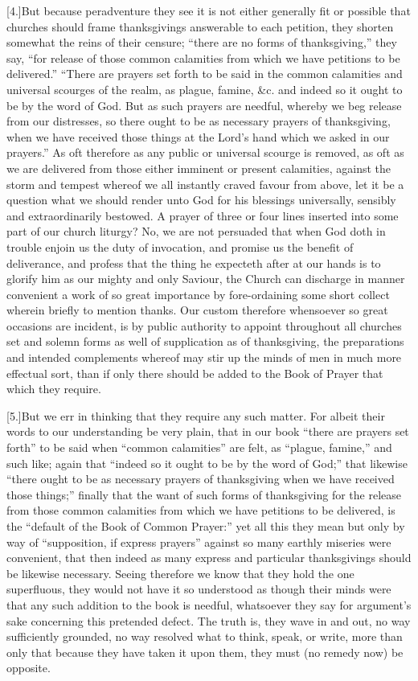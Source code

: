 [4.]But because peradventure they see it is not either generally fit or possible that churches should frame thanksgivings answerable to each petition, they shorten somewhat the reins of their censure; “there are no forms of thanksgiving,” they say, “for release of those common calamities from which we have petitions to be delivered.” “There are prayers set forth to be said in the common calamities and universal scourges of the realm, as plague, famine, \&c. and indeed so it ought to be by the word of God. But as such prayers are needful, whereby we beg release from our distresses, so there ought to be as necessary prayers of thanksgiving, when we have received those things at the Lord’s hand which we asked in our prayers.” As oft therefore as any public or universal scourge is removed, as oft as we are delivered from those either imminent or present calamities, against the storm and tempest whereof we all instantly craved favour from above, let it be a question what we should render unto God for his blessings universally, sensibly and extraordinarily bestowed. A prayer of three or four lines inserted into some part of our church liturgy? No, we are not persuaded that when God doth in trouble enjoin us the duty of invocation, and promise us the benefit of deliverance, and profess that the thing he expecteth  after at our hands is to glorify him as our mighty and only Saviour,
 the Church can discharge in manner convenient a work of so great importance by fore-ordaining some short collect wherein briefly to mention thanks. Our custom therefore whensoever so great occasions are incident, is by public authority to appoint throughout all churches set and solemn forms as well of supplication as of thanksgiving, the preparations and intended complements whereof may stir up the minds of men in much more effectual sort, than if only there should be added to the Book of Prayer that which they require.

[5.]But we err in thinking that they require any such matter. For albeit their words to our understanding be very plain, that in our book “there are prayers set forth” to be said when “common calamities” are felt, as “plague, famine,” and such like; again that “indeed so it ought to be by the word of God;” that likewise “there ought to be as necessary prayers of thanksgiving when we have received those things;” finally that the want of such forms of thanksgiving for the release from those common calamities from which we have petitions to be delivered, is the “default of the Book of Common Prayer:” yet all this they mean but only by way of “supposition, if express prayers” against so many earthly miseries were convenient, that then indeed as many express and particular thanksgivings should be likewise necessary. Seeing therefore we know that they hold the one superfluous, they would not have it so understood as though their minds were that any such addition to the book is needful, whatsoever they say for argument’s sake concerning this pretended defect. The truth is, they wave in and out, no way sufficiently grounded, no way resolved what to think, speak, or write, more than only that because they have taken it upon them, they must (no remedy now) be opposite.


